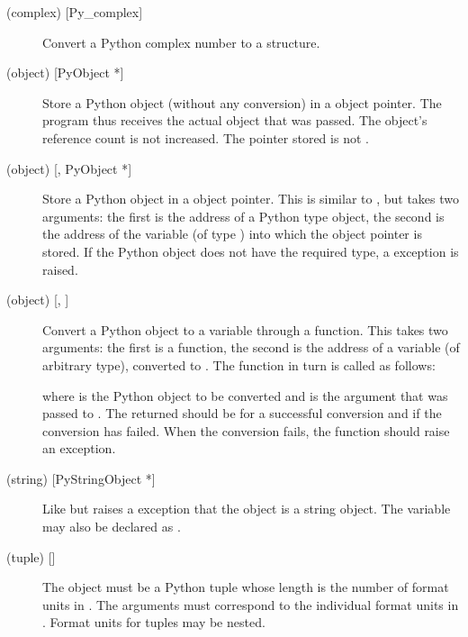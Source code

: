 \documentclass[twoside,openright]{report}
\begin{document}
\begin{description}
\item[ (complex) {[Py_complex]}]
Convert a Python complex number to a \C{}  structure.

\item[ (object) {[PyObject *]}]
Store a Python object (without any conversion) in a \C{} object pointer.
The \C{} program thus receives the actual object that was passed.  The
object's reference count is not increased.  The pointer stored is not
\NULL{}.

\item[ (object) {[, PyObject *]}]
Store a Python object in a \C{} object pointer.  This is similar to
, but takes two \C{} arguments: the first is the address of a
Python type object, the second is the address of the \C{} variable (of
type ) into which the object pointer is stored.
If the Python object does not have the required type, a
 exception is raised.

\item[ (object) {[, ]}]
Convert a Python object to a \C{} variable through a 
function.  This takes two arguments: the first is a function, the
second is the address of a \C{} variable (of arbitrary type), converted
to .  The  function in turn is called as
follows:


where  is the Python object to be converted and
 is the  argument that was passed to
.  The returned  should be
 for a successful conversion and  if the conversion
has failed.  When the conversion fails, the  function
should raise an exception.

\item[ (string) {[PyStringObject *]}]
Like  but raises a  exception that the object
is a string object.  The \C{} variable may also be declared as
.

\item[ (tuple) {[]}]
The object must be a Python tuple whose length is the number of format
units in .  The \C{} arguments must correspond to the
individual format units in .  Format units for tuples may
be nested.

\end{description}
\end{document}
